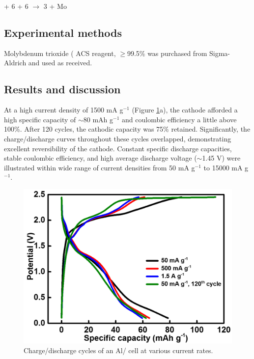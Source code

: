 \begin{center}
  + 6 + 6 $\longrightarrow$ 3 + Mo   
\end{center}

\subsection{Experimental methods}
Molybdenum trioxide ( ACS reagent, $\geq$99.5\% was purchased from Sigma-Aldrich and used as received.

\subsection{Results and discussion}
At a high current density of 1500 mA g$^{-1}$ (Figure \ref{Figures/chap6fig:MoO3CDC2}a), the  cathode afforded a  high specific capacity of $\sim$80 mAh g$^{-1}$ and coulombic efficiency a little above 100\%. After 120 cycles, the cathodic capacity was 75\% retained. Significantly, the charge/discharge curves throughout these cycles overlapped, demonstrating excellent reversibility of the  cathode. Constant specific discharge capacities, stable coulombic efficiency, and high average discharge voltage ($\sim$1.45 V) were illustrated within wide range of current densities from 50 mA g$^{-1}$ to 15000 mA g$^{-1}$. 

\begin{figure}[th!]
\centering
\includegraphics[width=\textwidth]{Figures/chap6fig/MoO3CDC2}
\caption{Charge/discharge cycles of an Al/ cell at various current rates.}
\label{Figures/chap6fig:MoO3CDC2}
\end{figure}

